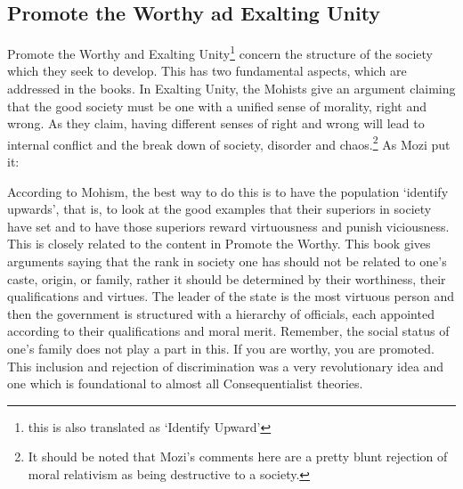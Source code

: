 \subsection{Promote the Worthy ad Exalting Unity}

Promote the Worthy and Exalting Unity\footnote{this is also translated as `Identify Upward'} concern the structure of the society which they seek to develop. This has two fundamental aspects, which are addressed in the books. In Exalting Unity, the Mohists give an argument claiming that the good society must be one with a unified sense of morality, right and wrong. As they claim, having different senses of right and wrong will lead to internal conflict and the break down of society, disorder and chaos.\footnote{It should be noted that Mozi's comments here are a pretty blunt rejection of moral relativism as being destructive to a society.} As Mozi put it: 


According to Mohism, the best way to do this is to have the population `identify upwards', that is, to look at the good examples that their superiors in society have set and to have those superiors reward virtuousness and punish viciousness. This is closely related to the content in Promote the Worthy. This book gives arguments saying that the rank in society one has should not be related to one's caste, origin, or family, rather it should be determined by their worthiness, their qualifications and virtues. The leader of the state is the most virtuous person and then the government is structured with a hierarchy of officials, each appointed according to their qualifications and moral merit. Remember, the social status of one's family does not play a part in this. If you are worthy, you are promoted. This inclusion and rejection of discrimination was a very revolutionary idea and one which is foundational to almost all Consequentialist theories. 

